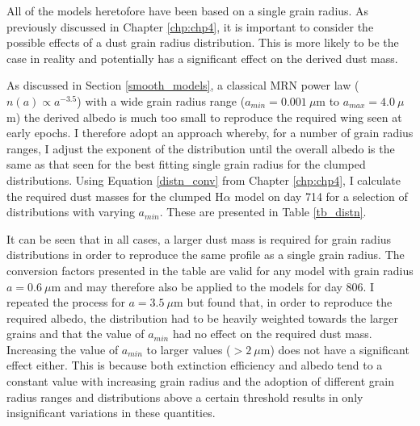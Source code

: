 All of the models heretofore have been based on a single grain radius.  As previously discussed in Chapter \ref{chp:chp4}, it is important to consider the possible effects of a dust grain radius distribution.  This is more likely to be the case in reality and potentially has a significant effect on the derived dust mass.  

 As discussed in Section \ref{smooth_models}, a classical MRN power law ($n(a) \propto a^{-3.5}$) with a wide grain radius range ($a_{min} = 0.001~\mu$m to $a_{max} = 4.0~\mu$m) the derived albedo is much too small to reproduce the required wing seen at early epochs.  I therefore adopt an approach whereby, for a number of grain radius ranges, I adjust the exponent of the distribution until the overall albedo is the same as that seen for the best fitting single grain radius for the clumped distributions. Using Equation \ref{distn_conv} from Chapter \ref{chp:chp4}, I calculate the required dust masses for the clumped H$\alpha$ model on day 714 for a selection of distributions with varying $a_{min}$.  These are presented in Table \ref{tb_distn}.  
 
 It can be seen that in all cases, a larger dust mass is required for grain radius distributions in order to reproduce the same profile as a single grain radius.  The conversion factors presented in the table are valid for any model with grain radius $a=0.6~\mu$m and may therefore also be applied to the models for day 806.  I repeated the process for $a=3.5~\mu$m but found that, in order to reproduce the required albedo, the distribution had to be heavily weighted towards the larger grains and that the value of $a_{min}$ had no effect on the required dust mass.  Increasing the value of $a_{min}$ to larger values ($>2~\mu$m) does not have a significant effect either.  This is because both extinction efficiency and albedo tend to a constant value with increasing grain radius and the adoption of different grain radius ranges and distributions above a certain threshold results in only insignificant variations in these quantities.
 
